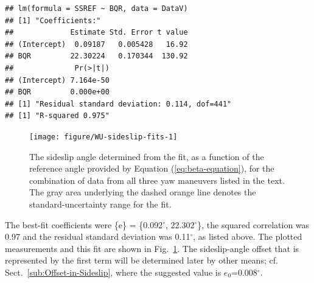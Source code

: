 \documentclass[12pt,twoside,english]{article}\usepackage[]{graphicx}\usepackage[]{color}
\makeatletter
\newenvironment{kframe}{%
 \def\at@end@of@kframe{}%
 \ifinner\ifhmode%
  \def\at@end@of@kframe{\end{minipage}}%
  \begin{minipage}{\columnwidth}%
 \fi\fi%
 \def\FrameCommand##1{\hskip\@totalleftmargin \hskip-\fboxsep
 \colorbox{shadecolor}{##1}\hskip-\fboxsep
     \hskip-\linewidth \hskip-\@totalleftmargin \hskip\columnwidth}%
 \MakeFramed {\advance\hsize-\width
   \@totalleftmargin\z@ \linewidth\hsize
   \@setminipage}}%
 {\par\unskip\endMakeFramed%
 \at@end@of@kframe}
\newenvironment{knitrout}{}{} %
\let\OrgIndex\index
\renewcommand*{\index}[1]{\OrgIndex{#1}}
\makeatother
\begin{document}
\begin{knitrout}\footnotesize
{}\color{fgcolor}\begin{kframe}
\begin{verbatim}
## lm(formula = SSREF ~ BQR, data = DataV)
## [1] "Coefficients:"
##             Estimate Std. Error t value
## (Intercept)  0.09187   0.005428   16.92
## BQR         22.30224   0.170344  130.92
##              Pr(>|t|)
## (Intercept) 7.164e-50
## BQR         0.000e+00
## [1] "Residual standard deviation: 0.114, dof=441"
## [1] "R-squared 0.975"
\end{verbatim}
\end{kframe}\begin{figure}

{\centering \texttt{[image: figure/WU-sideslip-fits-1]} 

}

\caption[Sideslip angle determined from the fit, for the combination of data from all three yaw maneuvers listed in the text.]{The sideslip angle determined from the fit, as a function of the reference angle provided by Equation (\ref{eq:beta-equation}), for the combination of data from all three yaw maneuvers listed in the text. The gray area underlying the dashed orange line denotes the standard-uncertainty range for the fit.}\label{fig:sideslip-fits}
\end{figure}


\end{knitrout}

The best-fit coefficients  
were \{e\} = \{0.092$^{\circ}$, 22.302$^{\circ}$\},  
the squared correlation was 0.97  
and the residual standard deviation was 0.11$^{\circ}$,  
as listed above. The plotted measurements and this fit are shown in Fig.~\ref{fig:sideslip-fits}. The sideslip-angle offset that is represented by the first term will be determined later by other means; cf. Sect.~\ref{sub:Offset-in-Sideslip}, where the suggested value is $e_0$=0.008$^{\circ}$.
\end{document}
